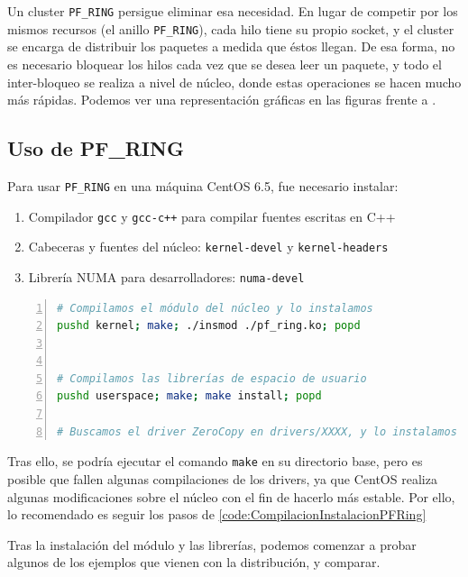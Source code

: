 Un cluster \texttt{PF\_RING} persigue eliminar esa necesidad. En lugar de competir por los mismos recursos (el anillo 
\texttt{PF\_RING}), cada hilo tiene su propio socket, y el cluster se encarga de distribuir los paquetes a medida que 
éstos llegan. De esa forma, no es necesario bloquear los hilos cada vez que se desea leer un paquete, y todo el 
inter-bloqueo se realiza a nivel de núcleo, donde estas operaciones se hacen mucho más rápidas. Podemos ver una 
representación gráficas en las figuras  frente a  
\cite{MonitoringUsingNtop}.

\subsection{Uso de PF\_RING}
Para usar \texttt{PF\_RING} en una máquina CentOS 6.5, fue necesario instalar:
\begin{enumerate}
 \item Compilador \texttt{gcc} y \texttt{gcc-c++} para compilar fuentes escritas en C++
 \item Cabeceras y fuentes del núcleo: \texttt{kernel-devel} y \texttt{kernel-headers}
 \item Librería NUMA para desarrolladores: \texttt{numa-devel}
\end{enumerate}

\begin{lstlisting}[language=bash,caption={Compilación e instalación de \texttt{PF\_RING}}, 
breaklines=true, label=code:CompilacionInstalacionPFRing,numbers=left,float=htbp]
# Compilamos el módulo del núcleo y lo instalamos
pushd kernel; make; ./insmod ./pf_ring.ko; popd


# Compilamos las librerías de espacio de usuario
pushd userspace; make; make install; popd

# Buscamos el driver ZeroCopy en drivers/XXXX, y lo instalamos
\end{lstlisting}

Tras ello, se podría ejecutar el comando \texttt{make} en su directorio base, pero es posible que fallen algunas 
compilaciones de los drivers, ya que CentOS realiza algunas modificaciones sobre el núcleo con el fin de hacerlo más 
estable. Por ello, lo recomendado es seguir los pasos de \lstlistingname{} \ref{code:CompilacionInstalacionPFRing}

Tras la instalación del módulo y las librerías, podemos comenzar a probar algunos de los ejemplos que vienen con la 
distribución, y comparar.

